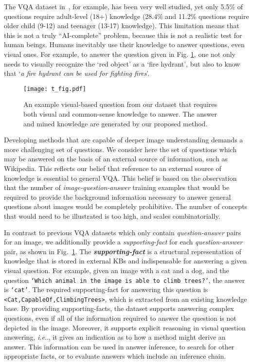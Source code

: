 \documentclass[10pt,journal]{IEEEtran}
\makeatletter
\DeclareRobustCommand\onedot{\futurelet\@let@token\@onedot}
\def\@onedot{\ifx\@let@token.\else.\null\fi\xspace}
\def\ie{\emph{i.e}\onedot} \def\Ie{\emph{I.e}\onedot}
\def\bluetext{}
\makeatother
\begin{document}
\bluetext{
The VQA dataset in~\cite{antol2015vqa}, for example, has been very well studied, yet only 5.5\% of questions require adult-level (18+) knowledge (28.4\% and 11.2\% questions require older child (9-12) and teenager (13-17) knowledge). }
This limitation means that this is not a truly ``AI-complete'' problem, because this is not a realistic test for human beings. Humans inevitably use their knowledge to answer questions, even visual ones.
For example, to answer the question given in  Fig. \ref{fig:t_figure}, one not only needs to visually recognize the `red object' as a `fire hydrant', but also to know that `{\em a fire hydrant can be used for fighting fires}'.

\begin{figure}[t!]
\begin{center}
	\texttt{[image: t\_fig.pdf]}
\end{center}
\vspace{-4pt}
\caption{An example visual-based question from our \KBName dataset that requires both visual and common-sense knowledge to answer. The answer and mined knowledge are generated by our proposed method.}
\label{fig:t_figure}
\vspace{-5pt}
\end{figure}

Developing methods that are capable of deeper image understanding demands a more challenging set of questions.
We consider here the set of questions which may be answered on the basis of an external source of information, such as Wikipedia.
This reflects our belief that reference to an external source of knowledge is essential to general VQA.  This belief is based on the observation that the number of \textit{image-question-answer} training examples that would be required to provide the background information necessary to answer general questions about images would be completely prohibitive.
The number of concepts that would need to be illustrated is too high, and scales combinatorially.

In contrast to previous VQA datasets which only contain \textit{question-answer} pairs for an image, we additionally provide a \textit{supporting-fact} for each \textit{question-answer} pair, as shown in Fig.~\ref{fig:t_figure}. The \textit{\bf supporting-fact} is a structural representation of knowledge that is stored in external KBs and indispensable for answering a given visual question.
For example, given an image with a cat and a dog, and the question  \texttt{`Which animal in the image is able to climb trees?'},  the answer is \texttt{`cat'}. The required supporting-fact for answering this question is \texttt{<Cat,CapableOf,ClimbingTrees>}, which is extracted from an existing knowledge base. By providing supporting-facts, the dataset supports answering complex questions, even if all of the information required to answer the question is not depicted in the image. Moreover, it supports explicit reasoning in visual question answering, \ie, it gives an indication  as to how a method might derive an answer. This information can be used in answer inference, to search for other appropriate facts, or to evaluate answers which include an inference chain.
\end{document}
